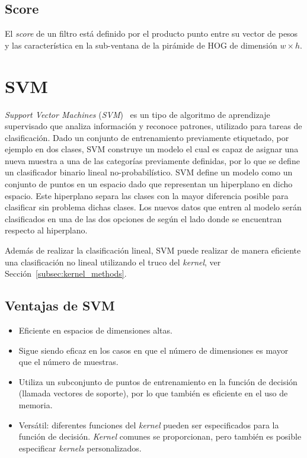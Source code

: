 \subsection{Score}
El \textit{score} de un filtro está definido por el producto punto entre su vector de pesos y las característica en la sub-ventana de la pirámide de HOG de dimensión $w \times h$.
\section{SVM}\label{sec:lsvm}

\textit{Support Vector Machines} (\textit{SVM})~\cite{Vapnik1995, Duda2000, Cortes1995} es un tipo de algoritmo de aprendizaje supervisado que analiza información y reconoce patrones, utilizado para tareas de clasificación. Dado un conjunto de entrenamiento previamente etiquetado, por ejemplo en dos clases, SVM construye un modelo el cual es capaz de asignar una nueva muestra a una de las categorías previamente definidas, por lo que se define un clasificador binario lineal no-probabilístico.
SVM define un modelo como un conjunto de puntos en un espacio dado que representan un hiperplano en dicho espacio. Este hiperplano separa las clases con la mayor diferencia posible para clasificar sin problema dichas clases. Los nuevos datos que entren al modelo serán clasificados en una de las dos opciones de según el lado donde se encuentran respecto al hiperplano.

Además de realizar la clasificación lineal, SVM puede realizar de manera eficiente una clasificación no lineal utilizando el truco del \textit{kernel}, ver Sección~\ref{subsec:kernel_methods}.%

\subsection{Ventajas de SVM}
\begin{itemize}
\item Eficiente en espacios de dimensiones altas.
\item Sigue siendo eficaz en los casos en que el número de dimensiones es mayor que el número de muestras.
\item Utiliza un subconjunto de puntos de entrenamiento en la función de decisión (llamada vectores de soporte), por lo que también es eficiente en el uso de memoria.
\item Versátil: diferentes funciones del \textit{kernel} pueden ser especificados para la función de decisión. \textit{Kernel} comunes se proporcionan, pero también es posible especificar \textit{kernels} personalizados.
\end{itemize}

